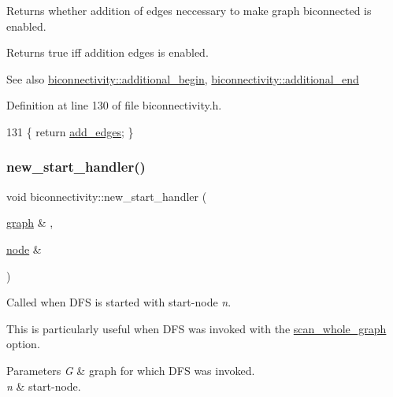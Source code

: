 Returns whether addition of edges neccessary to make graph biconnected is enabled. 

\begin{DoxyReturn}{Returns}
true iff addition edges is enabled. 
\end{DoxyReturn}
\begin{DoxySeeAlso}{See also}
\mbox{\hyperlink{classbiconnectivity_a9560cdde8a90c12760b9930c494be410}{biconnectivity\+::additional\+\_\+begin}}, \mbox{\hyperlink{classbiconnectivity_a801847685ebf2b5727743cd21401e88c}{biconnectivity\+::additional\+\_\+end}} 
\end{DoxySeeAlso}


Definition at line 130 of file biconnectivity.\+h.


\begin{DoxyCode}
131     \{ \textcolor{keywordflow}{return} \mbox{\hyperlink{classbiconnectivity_a70c1310b4ba83dbe10594f3a33f94763}{add\_edges}}; \}
\end{DoxyCode}
\mbox{\label{classbiconnectivity_ae94213830755f1f4d477ec6bff0f25b8}} 
\subsubsection{\texorpdfstring{new\+\_\+start\+\_\+handler()}{new\_start\_handler()}}
{\footnotesize\ttfamily void biconnectivity\+::new\+\_\+start\+\_\+handler (\begin{DoxyParamCaption}\item[{\mbox{\hyperlink{classgraph}{graph}} \&}]{,  }\item[{\mbox{\hyperlink{classnode}{node}} \&}]{ }\end{DoxyParamCaption})\hspace{0.3cm}{\ttfamily [virtual]}}



Called when D\+FS is started with start-\/node {\itshape n}. 

This is particularly useful when D\+FS was invoked with the \mbox{\hyperlink{classdfs_aa7c864a6f3a120720138b187b3ed95b5}{scan\+\_\+whole\+\_\+graph}} option.


\begin{DoxyParams}{Parameters}
{\em G} & graph for which D\+FS was invoked. \\
\hline
{\em n} & start-\/node. \\
\hline
\end{DoxyParams}


